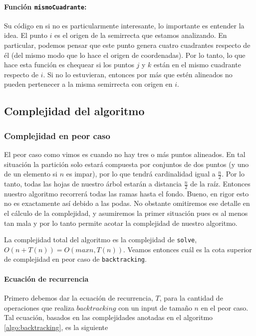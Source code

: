 
  \paragraph{Función \texttt{mismoCuadrante}:} Su código en si no es particularmente interesante, lo importante es entender la idea. El punto $i$ es el origen de la semirrecta que estamos analizando. En particular, podemos pensar que este punto genera cuatro cuadrantes respecto de él (del mismo modo que lo hace el origen de coordenadas). Por lo tanto, lo que hace esta función es chequear si los puntos $j$ y $k$ están en el mismo cuadrante respecto de $i$. Si no lo estuvieran, entonces por más que estén alineados no pueden pertenecer a la misma semirrecta con origen en $i$.

\subsection{Complejidad del algoritmo}
\subsubsection{Complejidad en peor caso}
El peor caso como vimos es cuando no hay tres o más puntos alineados. En tal situación la partición solo estará compuesta por conjuntos de dos puntos (y uno de un elemento si $n$ es impar), por lo que tendrá cardinalidad igual a $\frac{n}{2}$. Por lo tanto, todas las hojas de nuestro árbol estarán a distancia $\frac{n}{2}$ de la raíz. Entonces nuestro algoritmo recorrerá todas las ramas hasta el fondo. Bueno, en rigor esto no es exactamente así debido a las podas. No obstante omitiremos ese detalle en el cálculo de la complejidad, y asumiremos la primer situación pues es al menos tan mala y por lo tanto permite acotar la complejidad de nuestro algoritmo.

La complejidad total del algoritmo es la complejidad de \texttt{solve}, $O(n + T(n)) = O(max{n, T(n)})$. Veamos entonces cuál es la cota superior de complejidad en peor caso de \texttt{backtracking}. 

\paragraph{Ecuación de recurrencia}
Primero debemos dar la ecuación de recurrencia, $T$, para la cantidad de operaciones que realiza $backtracking$ con un input de tamaño $n$ en el peor caso. Tal ecuación, basados en las complejidades anotadas en el algoritmo \ref{algo:backtracking}, es la siguiente

